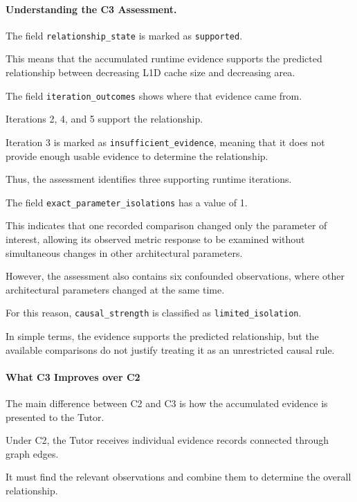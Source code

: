 \paragraph{Understanding the C3 Assessment.}

The field
\texttt{relationship\_state}
is marked as \texttt{supported}.

This means that the accumulated
runtime evidence supports
the predicted relationship
between decreasing L1D cache size
and decreasing area.

The field
\texttt{iteration\_outcomes}
shows where that evidence
came from.

Iterations 2, 4, and 5
support the relationship.

Iteration 3 is marked
as \texttt{insufficient\_evidence},
meaning that it does not
provide enough usable evidence
to determine the relationship.

Thus, the assessment identifies
three supporting runtime iterations.

The field
\texttt{exact\_parameter\_isolations}
has a value of 1.

This indicates that one
recorded comparison changed
only the parameter of interest,
allowing its observed metric
response to be examined
without simultaneous changes
in other architectural parameters.

However, the assessment also
contains six confounded observations,
where other architectural parameters
changed at the same time.

For this reason,
\texttt{causal\_strength}
is classified as
\texttt{limited\_isolation}.

In simple terms, the evidence
supports the predicted relationship,
but the available comparisons
do not justify treating it
as an unrestricted causal rule.


\paragraph{What C3 Improves over C2}

The main difference between
C2 and C3 is how the accumulated
evidence is presented to the Tutor.

Under C2, the Tutor receives
individual evidence records
connected through graph edges.

It must find the relevant
observations and combine them
to determine the overall
relationship.


